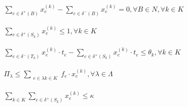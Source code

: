 \documentclass[11pt]{article}
\begin{document}
\begin{align}
\begin{split}\label{mass-balance}
     \sum_{e\in\delta^+(B)}x_e^{(k)} - \sum_{e\in\delta^-(B)}x_e^{(k)} 
     = 0, \forall B\in N, \forall k\in K\\
\end{split}\\
\begin{split}\label{source}
         \sum_{e\in\delta^+(S_k)}x_e^{(k)}
         \le 1, \forall k\in K\\
\end{split}\\
\begin{split}\label{time-flow}
          \sum_{e\in\delta^-(T_k)}x_e^{(k)}\cdot t_e - \sum_{e\in\delta^+(S_k)}x_e^{(k)}\cdot t_e 
          \le \theta_k, \forall k\in K\\
\end{split}\\
\begin{split}\label{minimum}
        \Pi_\lambda 
        \le \sum_{\substack{e\in\lambda k \in K}}f_e\cdot x_e^{(k)}, \forall\lambda\in\Lambda\\
\end{split}\\
\begin{split}\label{max_num_insps}
        \sum_{k\in K} \sum_{e\in\delta^+(S_k)}x_e^{(k)}
        \le \kappa\\
\end{split}
\end{align}
\end{document}
